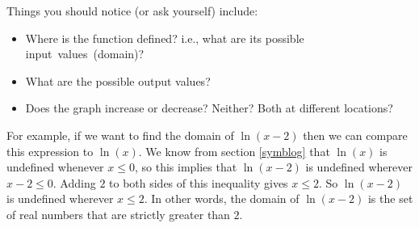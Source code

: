 Things you should notice (or ask yourself) include:
\begin{itemize}
\item Where is the function defined? i.e., what are its possible input~values~(domain)?
\item What are the possible output values?
\item Does the graph increase or decrease? Neither? Both at different locations?
\end{itemize}

\noindent For example, if we want to find the domain of $\ln(x-2)$ then we can compare this expression to $\ln(x)$. We know from section \ref{symblog} that $\ln(x)$ is undefined whenever $x \leq 0$, so this implies that $\ln(x - 2)$ is undefined wherever $x - 2 \leq 0$. Adding $2$ to both sides of this inequality gives $x \leq 2$. So $\ln(x - 2)$ is undefined wherever $x \leq 2$. In other words, the domain of $\ln(x-2)$ is the set of real numbers that are strictly greater than $2$.

